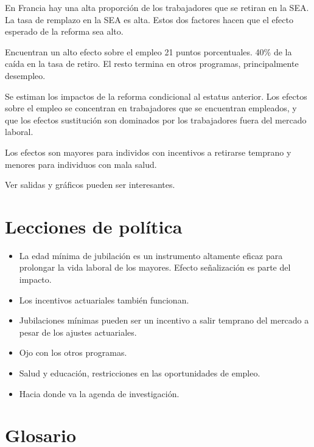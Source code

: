 \documentclass[]{article}
\providecommand{\tightlist}{%
  \setlength{\itemsep}{0pt}\setlength{\parskip}{0pt}}
\begin{document}
En Francia hay una alta proporción de los trabajadores que se retiran en
la SEA. La tasa de remplazo en la SEA es alta. Estos dos factores hacen
que el efecto esperado de la reforma sea alto.

Encuentran un alto efecto sobre el empleo 21 puntos porcentuales. 40\%
de la caída en la tasa de retiro. El resto termina en otros programas,
principalmente desempleo.

Se estiman los impactos de la reforma condicional al estatus anterior.
Los efectos sobre el empleo se concentran en trabajadores que se
encuentran empleados, y que los efectos sustitución son dominados por
los trabajadores fuera del mercado laboral.

Los efectos son mayores para individos con incentivos a retirarse
temprano y menores para individuos con mala salud.

Ver salidas y gráficos pueden ser interesantes.

\hypertarget{lecciones-de-poluxedtica}{%
\section{Lecciones de política}\label{lecciones-de-poluxedtica}}

\begin{itemize}
\tightlist
\item
  La edad mínima de jubilación es un instrumento altamente eficaz para
  prolongar la vida laboral de los mayores. Efecto señalización es parte
  del impacto.
\item
  Los incentivos actuariales también funcionan.
\item
  Jubilaciones mínimas pueden ser un incentivo a salir temprano del
  mercado a pesar de los ajustes actuariales.
\item
  Ojo con los otros programas.
\item
  Salud y educación, restricciones en las oportunidades de empleo.
\item
  Hacia donde va la agenda de investigación.
\end{itemize}

\hypertarget{glosario}{%
\section{Glosario}\label{glosario}}
\end{document}
